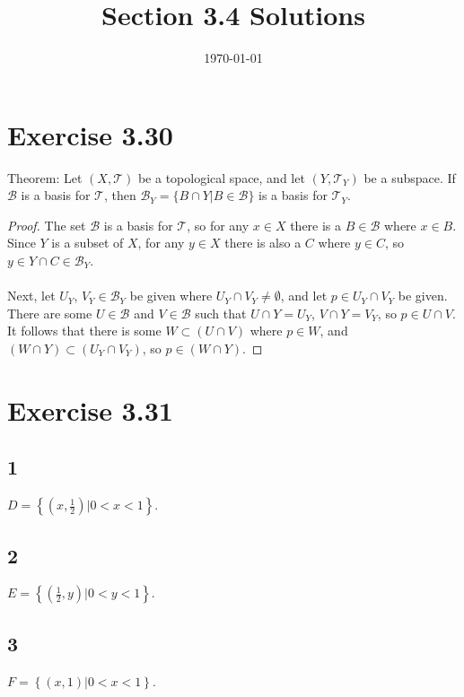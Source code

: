 \documentclass{article}
\title{\textbf{Section 3.4 Solutions}}
\date{}
\date\today
\begin{document}
\maketitle %

\thispagestyle{firstpage}
\section*{Exercise 3.30}

Theorem: Let $(X, \mathcal{T})$ be a topological space, and let $(Y, \mathcal{T}_Y)$ be a subspace.  If $\mathcal{B}$ is a 
basis for $\mathcal{T}$, then $\mathcal{B}_Y = \{B \cap Y | B \in \mathcal{B} \}$ is a basis for $\mathcal{T}_Y$.

\begin{proof}
  The set $\mathcal{B}$ is a basis for $\mathcal{T}$, so for any $x \in X$ there is a $B \in \mathcal{B}$ where $x \in B$.  Since $Y$ is a subset of 
  $X$, for any $y \in X$ there is also a $C$ where $y \in C$, so $y \in Y \cap C \in \mathcal{B}_Y$. \\ 
  \\ 
  Next, let $U_Y$, $V_Y \in \mathcal{B}_Y$ be given where $U_Y \cap V_Y \neq \emptyset$, and let $p \in U_Y \cap V_Y$ be given.  There are some $U \in \mathcal{B}$ 
  and $V \in \mathcal{B}$ such that $U \cap Y = U_Y$, $V \cap Y = V_Y$, so $p \in U \cap V$.  It follows that there is some $W \subset (U \cap V)$ where $p \in W$, 
  and $(W \cap Y) \subset (U_Y \cap V_Y)$, so $p \in (W \cap Y)$.
\end{proof}

\section*{Exercise 3.31} 

\subsection*{1} 
$D = \left\lbrace \left( x, \frac{1}{2}\right) | 0 < x < 1 \right\rbrace$. 


\subsection*{2} 
$E = \left\lbrace \left( \frac{1}{2}, y\right) | 0 < y < 1 \right\rbrace$. 



\subsection*{3} 
$F = \left\lbrace \left( x, 1 \right) | 0 < x < 1 \right\rbrace$. 
\end{document}
